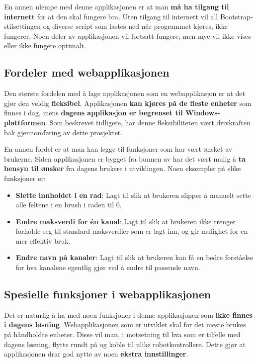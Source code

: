 En annen ulempe med denne applikasjonen er at man \textbf{må ha tilgang til internett} for at den skal fungere bra. Uten tilgang til internett vil all Bootstrap-stilsettingen og diverse script som lastes ned når programmet kjøres, ikke fungerer. Noen deler av applikasjonen vil fortsatt fungere, men mye vil ikke vises eller ikke fungere optimalt.

\subsection{Fordeler med webapplikasjonen}
Den største fordelen med å lage applikasjonen som en webapplikasjon er at det gjør den veldig \textbf{fleksibel}. Applikasjonen \textbf{kan kjøres på de fleste enheter} som finnes i dag, mens \textbf{dagens applikasjon er begrenset til Windows-plattformen}. Som beskrevet tidligere, har denne fleksibiliteten vært drivkraften bak gjennomføring av dette prosjektet.

En annen fordel er at man kan legge til funksjoner som har vært ønsket av brukerne. Siden applikasjonen er bygget fra bunnen av har det vært mulig å \textbf{ta hensyn til ønsker} fra dagens brukere i utviklingen. Noen eksempler på slike funksjoner er:
\begin{itemize}
    \item \textbf{Slette innholdet i en rad}: Lagt til slik at brukeren slipper å manuelt sette alle feltene i en brush i raden til 0.
    \item \textbf{Endre maksverdi for én kanal}: Lagt til slik at brukeren ikke trenger forholde seg til standard maksverdier som er lagt inn, og gir mulighet for en mer effektiv bruk.
    \item \textbf{Endre navn på kanaler}: Lagt til slik at brukeren kan få en bedre forståelse for hva kanalene egentlig gjør ved å endre til passende navn.
\end{itemize}

\subsection{Spesielle funksjoner i webapplikasjonen}
Det er naturlig å ha med noen funksjoner i denne applikasjonen som \textbf{ikke finnes i dagens løsning}. Webapplikasjonen som er utviklet skal for det meste brukes på håndholdte enheter. Disse vil man, i motsetning til hva som er tilfelle med dagens løsning, flytte rundt på og koble til ulike robotkontrollere. Dette gjør at applikasjonen drar god nytte av noen \textbf{ekstra innstillinger}.


